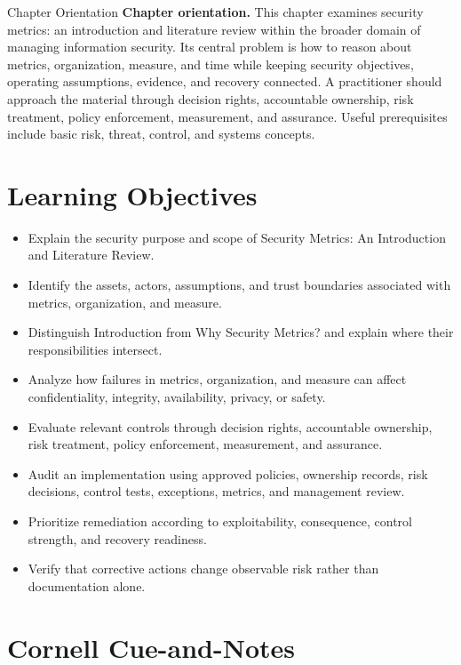 \documentclass[11pt,letterpaper]{article}
\title{\CornellDocumentTitle}
\author{}
\date{}
\begin{document}
\maketitle
\begin{CornellOverviewBox}{Chapter Orientation}
\textbf{Chapter orientation.} This chapter examines security metrics: an introduction and literature review within the broader domain of managing information security. Its central problem is how to reason about metrics, organization, measure, and time while keeping security objectives, operating assumptions, evidence, and recovery connected. A practitioner should approach the material through decision rights, accountable ownership, risk treatment, policy enforcement, measurement, and assurance. Useful prerequisites include basic risk, threat, control, and systems concepts.
\end{CornellOverviewBox}
\section*{Learning Objectives}
\begin{itemize}
\item Explain the security purpose and scope of Security Metrics: An Introduction and Literature Review.
\item Identify the assets, actors, assumptions, and trust boundaries associated with metrics, organization, and measure.
\item Distinguish Introduction from Why Security Metrics? and explain where their responsibilities intersect.
\item Analyze how failures in metrics, organization, and measure can affect confidentiality, integrity, availability, privacy, or safety.
\item Evaluate relevant controls through decision rights, accountable ownership, risk treatment, policy enforcement, measurement, and assurance.
\item Audit an implementation using approved policies, ownership records, risk decisions, control tests, exceptions, metrics, and management review.
\item Prioritize remediation according to exploitability, consequence, control strength, and recovery readiness.
\item Verify that corrective actions change observable risk rather than documentation alone.
\end{itemize}
\section*{Cornell Cue-and-Notes}
\end{document}
